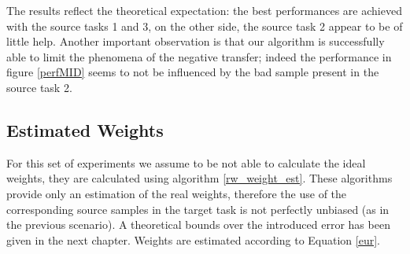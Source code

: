     \noindent The results reflect the theoretical expectation: the best performances are achieved
    with the source tasks 1 and 3, on the other side, the source task 2 appear to be of little help.\newline
    Another important observation is that our algorithm is successfully able
    to limit the phenomena of the negative transfer; indeed the performance in figure \ref{perfMID}
    seems to not be influenced by the bad sample present in the source task 2.

    \subsection{Estimated Weights}
    \noindent For this set of experiments we assume to be not able to calculate the ideal weights, they are calculated
    using algorithm \ref{rw_weight_est}. These algorithms provide only an
    estimation of the real weights, therefore the use of the corresponding source samples in the target
    task is not perfectly unbiased (as in the previous scenario). A theoretical bounds over the introduced
    error has been given in the next chapter. Weights are estimated according to Equation \ref{eur}.

